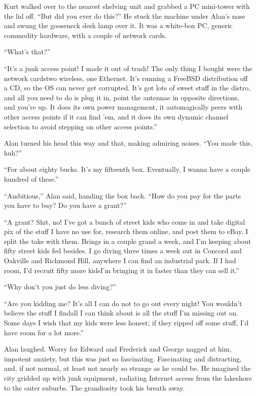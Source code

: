 Kurt walked over to the nearest shelving unit and grabbed a PC
mini-tower with the lid off.  ``But did you ever do this?'' He stuck
the machine under Alan's nose and swung the gooseneck desk lamp over
it.  It was a white-box PC, generic commodity hardware, with a couple
of network cards.

``What's that?''

``It's a junk access point!  I made it out of trash!  The only thing I
bought were the network cards\dash{}two wireless, one Ethernet.  It's
running a FreeBSD distribution off a CD, so the OS can never get
corrupted.  It's got lots of sweet stuff in the distro, and all you
need to do is plug it in, point the antennae in opposite directions,
and you're up.  It does its own power management, it automagically
peers with other access points if it can find 'em, and it does its own
dynamic channel selection to avoid stepping on other access points.''

Alan turned his head this way and that, making admiring noises.  ``You
made this, huh?''

``For about eighty bucks.  It's my fifteenth box.  Eventually, I wanna
have a couple hundred of these.''

``Ambitious,'' Alan said, handing the box back.  ``How do you pay for
the parts you have to buy?  Do you have a grant?''

``A grant?  Shit, no!  I've got a bunch of street kids who come in and
take digital pix of the stuff I have no use for, research them online,
and post them to eBay.  I split the take with them.  Brings in a
couple grand a week, and I'm keeping about fifty street kids fed
besides.  I go diving three times a week out in Concord and Oakville
and Richmond Hill, anywhere I can find an industrial park.  If I had
room, I'd recruit fifty more kids\dash{}I'm bringing it in faster than
they can sell it.''

``Why don't you just do less diving?''

``Are you kidding me?  It's all I can do not to go out every night! 
You wouldn't believe the stuff I find\dash{}all I can think about is all
the stuff I'm missing out on.  Some days I wish that my kids were less
honest; if they ripped off some stuff, I'd have room for a lot more.''

Alan laughed.  Worry for Edward and Frederick and George nagged at
him, impotent anxiety, but this was just so fascinating.  Fascinating
and distracting, and, if not normal, at least not nearly so strange as
he could be.  He imagined the city gridded up with junk equipment,
radiating Internet access from the lakeshore to the outer suburbs. 
The grandiosity took his breath away.

